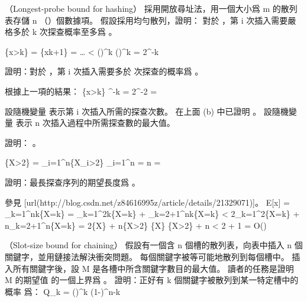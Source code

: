 \startsubject[
  title={Problems},
]

\startPROBLEM
（Longest-probe bound for hashing）
採用開放尋址法，用一個大小爲 m 的散列表存儲 n （）個數據項。
\startigBase[a]
\startitem
假設採用均勻散列，證明：
對於 ，第 i 次插入需要嚴格多於 k 次探查概率至多爲 。
\stopitem

\startANSWER
\startformula\startmathalignment
\NC \Pr\{x>k\}
    \NC = \Pr\{x\ge k+1\} \NR
\NC \NC =  \cdot {} \cdot \ldots \cdot {} \qquad {} \NR
\NC \NC < ()^k \NR
\NC \NC \le ()^k \NR
\NC \NC = 2^{-k} \NR
\stopmathalignment\stopformula
\stopANSWER

\startitem
證明：對於 ，第 i 次插入需要多於  次探查的概率爲 。
\stopitem

\startANSWER
根據上一項的結果：
\startformula
\Pr\{x>k\} ^{-k} = 2^{-2} = 
\stopformula
\stopANSWER

設隨機變量  表示第 i 次插入所需的探查次數。
在上面 (b) 中已證明 。
設隨機變量  表示 n 次插入過程中所需探查數的最大值。

\startitem
證明： 。
\stopitem

\startANSWER
\startformula
\Pr\{X>2\}
  = \sum_{i=1}^{n}\Pr\{X_i>2\}
  \le \sum_{i=1}^{n}
  = n \cdot {}
  = 
\stopformula
\stopANSWER

\startitem
證明：最長探查序列的期望長度爲 。
\stopitem

\startANSWER
參見 [url(http://blog.csdn.net/z84616995z/article/details/21329071)]。
\startformula\startmathalignment
\NC E[x]
    \NC = \sum_{k=1}^{n}k\Pr\{X=k\} \NR
\NC \NC = \sum_{k=1}^{2}k\Pr\{X=k\} + \sum_{k=2+1}^{n}k\Pr\{X=k\} \NR
\NC \NC < 2\sum_{k=1}^{2}\Pr\{X=k\} + n\sum_{k=2+1}^{n}\Pr\{X=k\} \NR
\NC \NC = 2\Pr\{X\} + n\Pr\{X>2\} \qquad {}
	  \Pr\{X\} \qquad
	  \Pr\{X>2\} \le {} \NR
\NC \NC {} + n \cdot {} \NR
\NC \NC < 2 + 1 \NR
\NC \NC = O() \NR
\stopmathalignment\stopformula
\stopANSWER

\stopigBase
\stopPROBLEM

\startPROBLEM
（Slot-size bound for chaining）
假設有一個含 n 個槽的散列表，向表中插入 n 個關鍵字，並用鏈接法解決衝突問題。
每個關鍵字被等可能地散列到每個槽中。
插入所有關鍵字後，設 M 是各槽中所含關鍵字數目的最大值。
讀者的任務是證明 M 的期望值  的一個上界爲 。
\startigBase[a]
\startitem
證明：正好有 k 個關鍵字被散列到某一特定槽中的概率  爲：
\startformula
Q_k = ()^k (1-)^{n-k} 
\stopformula
\stopitem

